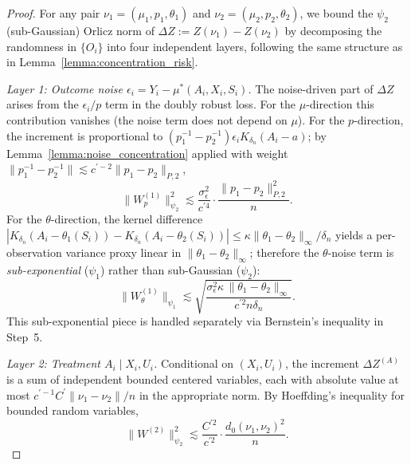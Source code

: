 \begin{proof}
For any pair $\nu_1=(\mu_1,p_1,\theta_1)$ and $\nu_2=(\mu_2,p_2,\theta_2)$, we bound the $\psi_2$ (sub-Gaussian) Orlicz norm of $\Delta Z := Z(\nu_1) - Z(\nu_2)$ by decomposing the randomness in $\{O_i\}$ into four independent layers, following the same structure as in Lemma~\ref{lemma:concentration_risk}.

\noindent\textit{Layer 1: Outcome noise $\epsilon_i = Y_i - \mu^*(A_i,X_i,S_i)$.}
The noise-driven part of $\Delta Z$ arises from the $\epsilon_i/p$ term in the doubly robust loss. For the $\mu$-direction this contribution vanishes (the noise term does not depend on $\mu$). For the $p$-direction, the increment is proportional to $(p_1^{-1}-p_2^{-1})\epsilon_i K_{\delta_n}(A_i-a)$; by Lemma~\ref{lemma:noise_concentration} applied with weight $\|p_1^{-1}-p_2^{-1}\|\lesssim c^{\prime-2}\|p_1-p_2\|_{P,2}$,
\begin{equation}\label{eq:layer1_p}
\bigl\|W^{(1)}_p\bigr\|_{\psi_2}^2 \lesssim \frac{\sigma_\epsilon^2}{c^{\prime4}}\cdot\frac{\|p_1-p_2\|_{P,2}^2}{n}.
\end{equation}
For the $\theta$-direction, the kernel difference $|K_{\delta_n}(A_i-\theta_1(S_i))-K_{\delta_n}(A_i-\theta_2(S_i))|\leq \kappa\|\theta_1-\theta_2\|_\infty/\delta_n$ yields a per-observation variance proxy linear in $\|\theta_1-\theta_2\|_\infty$; therefore the $\theta$-noise term is \emph{sub-exponential} ($\psi_1$) rather than sub-Gaussian ($\psi_2$):
\begin{equation}\label{eq:layer1_theta}
\bigl\|W^{(1)}_\theta\bigr\|_{\psi_1} \lesssim \sqrt{\frac{\sigma_\epsilon^2\kappa\,\|\theta_1-\theta_2\|_\infty}{c^{\prime2}n\delta_n}}.
\end{equation}
This sub-exponential piece is handled separately via Bernstein's inequality in Step~5.

\noindent\textit{Layer 2: Treatment $A_i\mid X_i,U_i$.}
Conditional on $(X_i,U_i)$, the increment $\Delta Z^{(A)}$ is a sum of independent bounded centered variables, each with absolute value at most $c^{\prime-1}C^{\prime}\|\nu_1-\nu_2\|/n$ in the appropriate norm. By Hoeffding's inequality for bounded random variables,
\begin{equation}\label{eq:layer2}
\bigl\|W^{(2)}\bigr\|_{\psi_2}^2 \lesssim \frac{C^{\prime2}}{c^{\prime2}}\cdot\frac{d_0(\nu_1,\nu_2)^2}{n}.
\end{equation}


\end{proof}
